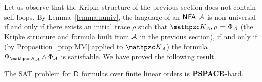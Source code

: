 Let us observe that the Kripke structure of the previous section does not contain self-loops.
%
By Lemma~\ref{lemma:nuniv}, the language of an $\text{\sffamily NFA}$ $\mathcal{A}$ is non-universal if and only if there exists an initial trace $\rho$ such that $\Ku_\Au,\rho\models \Phi_\Au$ (the Kripke structure and formula built from $\mathcal{A}$ in the previous section), if and only if (by Proposition~\ref{prop:MM} applied to $\Ku_\Au$) the formula $\Psi_{\Ku_\Au}\wedge\Phi_\Au$ is satisfiable. We have proved the following result.
%
\begin{theorem}
The SAT problem for $\mathsf{D}$ formulas over finite linear orders is $\textbf{PSPACE}$-hard.
\end{theorem}